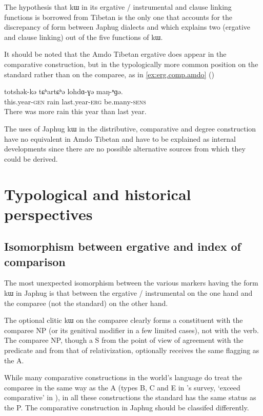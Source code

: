\documentclass[oldfontcommands,oneside,a4paper,11pt]{article}
\newcommand{\ipa}[1]{{\phon #1}} %
\begin{document}
The hypothesis that \ipa{kɯ} in its ergative / instrumental and clause linking functions is borrowed from Tibetan is the only one that accounts for the discrepancy of form between Japhug  dialects and which explains two (ergative and clause linking) out of the five functions of \ipa{kɯ}.

It should be noted that the Amdo Tibetan  ergative does appear in the comparative construction, but in the typologically more common position on the standard rather than on the comparee, as in \ref{ex:erg.comp.amdo}  (\citealt[239]{vbrugmo03maqu})

 \begin{exe} 
\ex \label{ex:erg.comp.amdo}
\gll 
\ipa{totshək-kə}  	\ipa{tɕʰartɕʰə}  	\ipa{lohdɑ-ɣə}  	\ipa{maŋ-ⁿɡə.}  \\
this.year-\textsc{gen} rain last.year-\textsc{erg} be.many-\textsc{sens} \\
 \glt   There was more rain this year than last year.
\end{exe}  

The uses of Japhug \ipa{kɯ} in the distributive, comparative and degree construction have no equivalent in Amdo Tibetan and have to be explained as internal developments since there are no  possible alternative sources from which they could be derived.

\section{Typological and historical perspectives} \label{sec:historical}

\subsection{Isomorphism between ergative and index of comparison}
The most unexpected isomorphism between the various markers having the form \ipa{kɯ} in Japhug is that between the ergative / instrumental on the one hand and the comparee (not the standard) on the other hand.   

The optional clitic \ipa{kɯ} on the comparee  clearly forms a constituent with the comparee NP (or its genitival modifier in a few limited cases), not with the verb. The comparee NP, though a S from the point of view of agreement with the predicate and from that of relativization, optionally receives  the same flagging as the A.

 
While many comparative constructions in the world's language do treat the comparee in the same way as the A (types B, C and E in \citealt[789]{dixon08comparative}'s survey, `exceed comparative' in  \citealt{stassen11comparative}), in all these constructions the standard has the same status as the P.  The comparative construction in Japhug should be classifed differently. 
\end{document}
